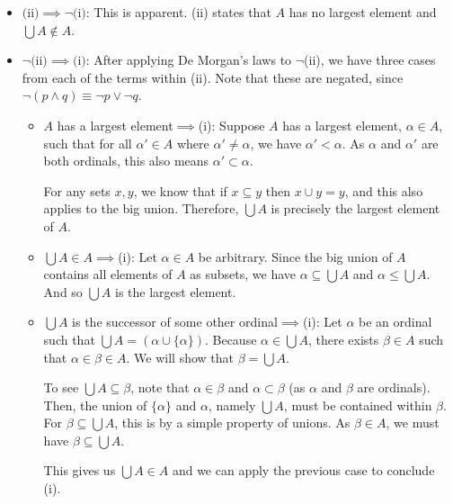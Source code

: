 \documentclass[a4paper]{article}
\begin{document}
\begin{itemize}
  \item $\text{(ii)} \implies \neg\text{(i)}$:
    This is apparent. (ii) states that $A$ has no largest
    element and $\bigcup A \notin A$.
  \item $\neg\text{(ii)} \implies \text{(i)}$:
    After applying De Morgan's laws to $\neg$(ii), we have three cases from each of the terms within (ii).
    Note that these are negated, since $\neg(p \wedge q) \equiv \neg p \vee \neg q$.
    \begin{itemize}
      \item $A$ has a largest element$ \implies $(i):
        Suppose $A$ has a largest element, $\alpha \in A$,
        such that for all $\alpha' \in A$ where $\alpha' \ne \alpha$,
        we have $\alpha' < \alpha$.
        As $\alpha$ and $\alpha'$ are both ordinals, 
        this also means $\alpha' \subset \alpha$.

        For any sets $x,y$, we know that if $x \subseteq y$ then $x \cup y = y$,
        and this also applies to the big union.
        Therefore, $\bigcup A$ is precisely the largest element of $A$.

      \item $\bigcup A \in A \implies $(i):
        Let $\alpha \in A$ be arbitrary. Since the big union of $A$ contains 
        all elements of $A$ as subsets,
        we have $\alpha \subseteq \bigcup A$ and $\alpha \le \bigcup A$.
        And so $\bigcup A$ is the largest element.
      \item $\bigcup A$ is the successor of some other ordinal$ \implies $(i):
        Let $\alpha$ be an ordinal such that $\bigcup A = (\alpha \cup \{\alpha\})$.
        Because $\alpha \in \bigcup A$, there exists $\beta \in A$ such that
        $\alpha \in \beta \in A$.
        We will show that $\beta = \bigcup A$.

        To see $\bigcup A \subseteq \beta$, note that $\alpha \in \beta$
        and $\alpha \subset \beta$ (as $\alpha$ and $\beta$ are ordinals).
        Then, the union of $\{\alpha\}$ and $\alpha$, namely $\bigcup A$, must be
        contained within $\beta$.
        For $\beta \subseteq \bigcup A$, this is by a simple property of unions.
        As $\beta \in A$, we must have $\beta \subseteq \bigcup A$.

        This gives us $\bigcup A \in A$ and we can apply the previous case
        to conclude (i). 
    \end{itemize}
\end{itemize}
\end{document}
